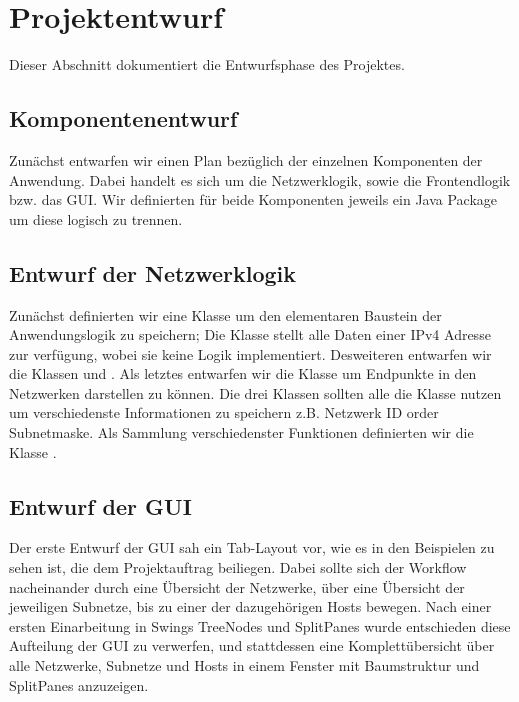 \section{Projektentwurf}
Dieser Abschnitt dokumentiert die Entwurfsphase des Projektes.

\subsection{Komponentenentwurf}
Zunächst entwarfen wir einen Plan bezüglich der einzelnen Komponenten der Anwendung.
Dabei handelt es sich um die Netzwerklogik, sowie die Frontendlogik bzw. das GUI.
Wir definierten für beide Komponenten jeweils ein Java Package um diese logisch zu trennen.

\subsection{Entwurf der Netzwerklogik}
Zunächst definierten wir eine Klasse um den elementaren Baustein der Anwendungslogik zu speichern;
Die Klasse  stellt alle Daten einer IPv4 Adresse zur verfügung,
wobei sie keine Logik implementiert. Desweiteren entwarfen wir die Klassen  und .
Als letztes entwarfen wir die Klasse  um Endpunkte in den Netzwerken darstellen zu können.
Die drei Klassen sollten alle die Klasse  nutzen um verschiedenste Informationen
zu speichern z.B. Netzwerk ID order Subnetmaske.
Als Sammlung verschiedenster Funktionen definierten wir die Klasse .

\subsection{Entwurf der GUI}
Der erste Entwurf der GUI sah ein Tab-Layout vor, wie es in den Beispielen zu sehen ist,
die dem Projektauftrag beiliegen. Dabei sollte sich der Workflow nacheinander durch eine
Übersicht der Netzwerke, über eine Übersicht der jeweiligen Subnetze, bis zu einer der
dazugehörigen Hosts bewegen. Nach einer ersten Einarbeitung in Swings TreeNodes und SplitPanes
wurde entschieden diese Aufteilung der GUI zu verwerfen, und stattdessen eine Komplettübersicht über 
alle Netzwerke, Subnetze und Hosts in einem Fenster mit Baumstruktur und SplitPanes anzuzeigen.